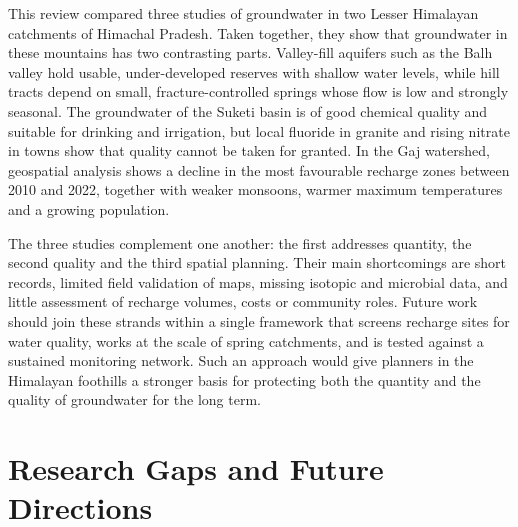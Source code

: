 \documentclass[10pt,a4paper,twocolumn]{article}
\begin{document}
This review compared three studies of groundwater in two Lesser Himalayan catchments of
Himachal Pradesh. Taken together, they show that groundwater in these mountains has two
contrasting parts. Valley-fill aquifers such as the Balh valley hold usable, under-developed
reserves with shallow water levels, while hill tracts depend on small, fracture-controlled
springs whose flow is low and strongly seasonal. The groundwater of the Suketi basin is of good
chemical quality and suitable for drinking and irrigation, but local fluoride in granite and
rising nitrate in towns show that quality cannot be taken for granted. In the Gaj watershed,
geospatial analysis shows a decline in the most favourable recharge zones between 2010 and
2022, together with weaker monsoons, warmer maximum temperatures and a growing population.

The three studies complement one another: the first addresses quantity, the second quality and
the third spatial planning. Their main shortcomings are short records, limited field
validation of maps, missing isotopic and microbial data, and little assessment of recharge
volumes, costs or community roles. Future work should join these strands within a single
framework that screens recharge sites for water quality, works at the scale of spring
catchments, and is tested against a sustained monitoring network. Such an approach would give
planners in the Himalayan foothills a stronger basis for protecting both the quantity and the
quality of groundwater for the long term.

\section{Research Gaps and Future Directions}
\end{document}
